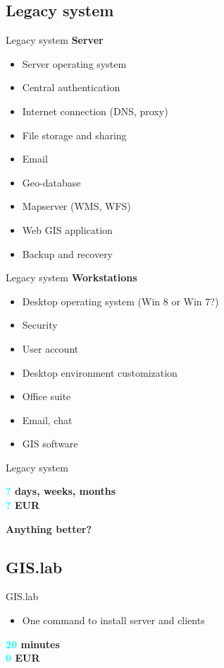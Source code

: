 \documentclass[12pt]{beamer}
\begin{document}
\subsection{Legacy system}
\begin{frame}{Legacy system}
	\textbf{Server}
	\begin{itemize}[<+->]
		\item Server operating system
		\item Central authentication
		\item Internet connection (DNS, proxy)
		\item File storage and sharing
		\item Email
		\item Geo-database
		\item Mapserver (WMS, WFS)
		\item Web GIS application
		\item Backup and recovery
	\end{itemize}
\end{frame}


\begin{frame}{Legacy system}
	\textbf{Workstations}
	\begin{itemize}[<+->]
		\item Desktop operating system (Win 8 or Win 7?)
		\item Security
		\item User account
		\item Desktop environment customization
		\item Office suite
		\item Email, chat
		\item GIS software
	\end{itemize}
\end{frame}


\begin{frame}{Legacy system}
	\begin{flushleft}
		\textbf{\textcolor{Cyan}{?} days, weeks, months} \\
		\textbf{\textcolor{Cyan}{?} EUR} \\
	\end{flushleft}
\end{frame}


\begin{frame}
	\LARGE \textbf{Anything better?}
\end{frame}


\subsection{GIS.lab}
\begin{frame}{GIS.lab}
	\begin{itemize}
		\item One command to install server and clients
	\end{itemize}
	\begin{flushleft}
		\textbf{\textcolor{Cyan}{20} minutes} \\
		\textbf{\textcolor{Cyan}{0} EUR} \\
	\end{flushleft}
\end{frame}
\end{document}
